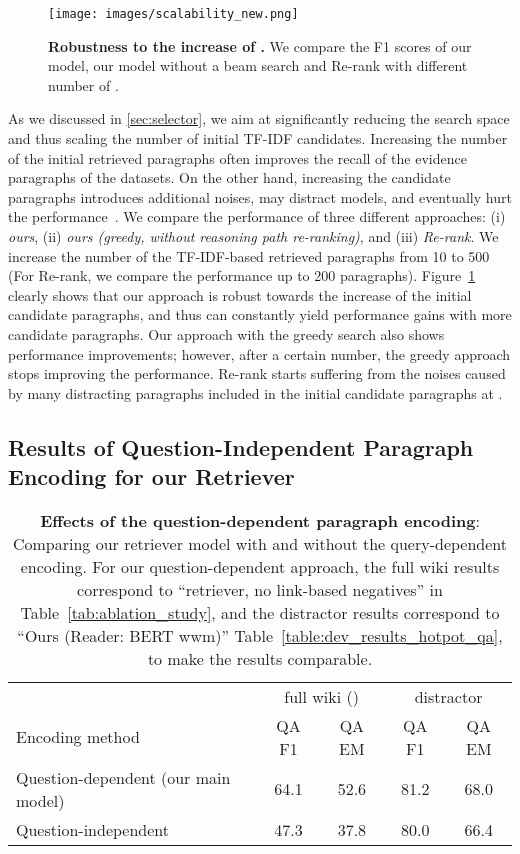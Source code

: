 \documentclass{article} \usepackage{iclr2020_conference,times}
\begin{document}
\begin{figure}[t!]
  \centering
  \texttt{[image: images/scalability\_new.png]}
  \caption{{\bf Robustness to the increase of .} We compare the F1 scores of our model, our model without a beam search and Re-rank with different number of . }
  \label{img:robustness}
\end{figure}

As we discussed in \ref{sec:selector}, we aim at significantly reducing the search space and thus scaling the number of initial TF-IDF candidates.
Increasing the number of the initial retrieved paragraphs often improves the recall of the evidence paragraphs of the datasets.
On the other hand, increasing the candidate paragraphs introduces additional noises, may distract models, and eventually hurt the performance~\citep{kratzwald-feuerriegel-2018-adaptive}.
We compare the performance of three different approaches: (i)  {\it ours}, (ii) {\it ours (greedy, without reasoning path re-ranking)}, and (iii) {\it Re-rank}. 
We increase the number of the TF-IDF-based retrieved paragraphs from 10 to 500 (For Re-rank, we compare the performance up to 200 paragraphs). 
Figure~\ref{img:robustness} clearly shows that our approach is robust towards the increase of the initial candidate paragraphs, and thus can constantly yield performance gains with more candidate paragraphs.
Our approach with the greedy search also shows performance improvements; however, after a certain number, the greedy approach stops improving the performance.
Re-rank starts suffering from the noises caused by many distracting paragraphs included in the initial candidate paragraphs at .

\subsection{Results of Question-Independent Paragraph Encoding for our Retriever}
\label{subsec:appendix_query_independent_results}

\begin{table}[t]
\begin{center}
\begin{tabular}{ l | c c | c c }\toprule 
& \multicolumn{2}{|c}{full wiki ()} & \multicolumn{2}{|c}{distractor} \\
 Encoding method  & QA F1 & QA EM & QA F1 & QA EM \\
  \midrule
  Question-dependent (our main model)  & 64.1 & 52.6 & 81.2 & 68.0 \\
  Question-independent                 & 47.3 & 37.8 & 80.0 & 66.4 \\
  \bottomrule
\end{tabular}
    \caption{{\bf Effects of the question-dependent paragraph encoding}: Comparing our retriever model with and without the query-dependent encoding. For our question-dependent approach, the full wiki results correspond to ``retriever, no link-based negatives'' in Table~\ref{tab:ablation_study}, and the distractor results correspond to ``Ours (Reader: BERT wwm)'' Table~\ref{table:dev_results_hotpot_qa}, to make the results comparable.
    }\label{table:query_independent_results}
\end{center}
\end{table}
\end{document}
